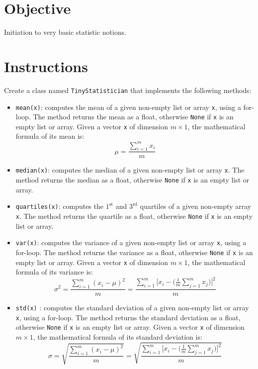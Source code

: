 \documentclass{42-en}
\begin{document}
\section*{Objective}
Initiation to very basic statistic notions.

\section*{Instructions}
Create a class named \texttt{TinyStatistician} that implements the following methods:
\begin{itemize}
  \item \texttt{mean(x)}: computes the mean of a given non-empty list or array \texttt{x}, using a for-loop.
  The method returns the mean as a float, otherwise \texttt{None} if \texttt{x} is an empty list or array.
  Given a vector \texttt{x} of dimension $m \times 1$, the mathematical formula of its mean is:
  $$
  \mu = \frac{\sum_{i = 1}^{m}{x_i}}{m}
  $$
  \item \texttt{median(x)}: computes the median of a given non-empty list or array \texttt{x}.
  The method returns the median as a float, otherwise \texttt{None} if \texttt{x} is an empty list or array. 
  \item \texttt{quartiles(x)}: computes the $1^{\text{st}}$ and $3^{\text{rd}}$ quartiles of a given non-empty array \texttt{x}.
  The method returns the quartile as a float, otherwise \texttt{None} if \texttt{x} is an empty list or array.
  \item \texttt{var(x)}: computes the variance of a given non-empty list or array \texttt{x}, using a for-loop.
  The method returns the variance as a float, otherwise \texttt{None} if \texttt{x} is an empty list or array.
  Given a vector \texttt{x} of dimension $m \times 1$, the mathematical formula of its variance is:
  $$
  \sigma^2 = \frac{\sum_{i = 1}^{m}{(x_i - \mu)^2}}{m} = \frac{\sum_{i = 1}^{m}{[x_i - (\frac{1}{m}\sum_{j = 1}^{m}{x_j}})]^2}{m}
  $$
  \item \texttt{std(x)} : computes the standard deviation of a given non-empty list  or array \texttt{x}, using a for-loop.
  The method returns the standard deviation as a float, otherwise \texttt{None} if \texttt{x} is an empty list or array.
  Given a vector \texttt{x} of dimension $m \times 1$, the mathematical formula of its standard deviation is:
  $$
  \sigma = \sqrt{\frac{\sum_{i = 1}^{m}{(x_i - \mu)^2}}{m}} = \sqrt{\frac{\sum_{i = 1}^{m}{[x_i - (\frac{1}{m}\sum_{j = 1}^{m}{x_j}})]^2}{m}}
  $$
\end{itemize}
\end{document}

